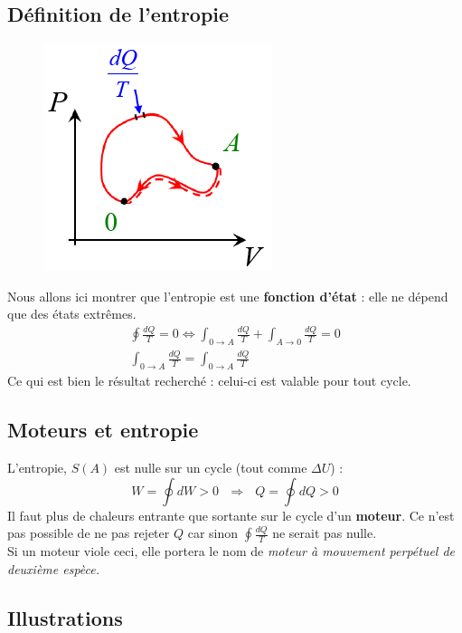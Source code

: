 \documentclass	[11pt, a4paper, openany]{book}
\begin{document}
\subsection{Définition de l'entropie}
\begin{figure}
\includegraphics[scale=0.44]{th/image19.png}
\end{figure}
Nous allons ici montrer que l'entropie est une \textbf{fonction d'état} : elle ne dépend que des états extrêmes.
\begin{eqnarray}
\oint \frac{dQ}{T} = 0 \Leftrightarrow \int_{0 \rightarrow A} \frac{dQ}{T} + \int_{A \rightarrow 0} \frac{dQ}{T} = 0\\
\int_{0 \rightarrow A} \frac{dQ}{T} = \int_{0 \rightarrow A} \frac{dQ}{T}
\end{eqnarray}
Ce qui est bien le résultat recherché : celui-ci est valable pour tout cycle.


\subsection{Moteurs et entropie}
L'entropie, $S(A)$ est nulle sur un cycle (tout comme $\Delta U$) :
\begin{equation}
W = \oint dW > 0\ \ \ \Rightarrow\ \ \ Q = \oint dQ > 0
\end{equation}
Il faut plus de chaleurs entrante que sortante sur le cycle d'un \textbf{moteur}. Ce n'est pas possible de ne pas rejeter $Q$ car sinon $\oint \frac{dQ}{T}$ ne serait pas nulle.\\
Si un moteur viole ceci, elle portera le nom de \textit{moteur à mouvement perpétuel de deuxième espèce.}

\subsection{Illustrations}
\end{document}
